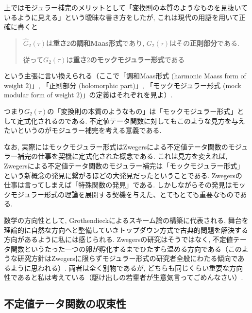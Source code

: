 \documentclass[11pt,b5paper,oneside,lualatex]{ltjsarticle} %
\numberwithin{equation}{section} %
\begin{document}
\begin{rem}
	上ではモジュラー補完のメリットとして「変換則の本質のようなものを見抜いているように見える」という曖昧な書き方をしたが, これは現代の用語を用いて正確に書くと
	\begin{quote}
		\centering
		$ \widehat{G}_2 (\tau) $は\textbf{重さ$ 2 $の調和Maas形式}であり, 
		$ G_2 (\tau) $はその\textbf{正則部分}である. 
		
		従って$ G_2 (\tau) $は\textbf{重さ$ 2 $のモックモジュラー形式}である
	\end{quote}
	という主張に言い換えられる（ここで「調和Maas形式 (harmonic Maass form of weight $ 2 $)」, 「正則部分 (holomorphic part)」, 「モックモジュラー形式 (mock modular form of weight $ 2 $)」の定義はそれぞれ\cite[Definition 4.2, Definition 4.4, Definition 5.16 i)]{BFOR}を見よ）. 
	
	つまり$ G_2 (\tau) $の「変換則の本質のようなもの」は「モックモジュラー形式」として定式化されるのである. 
	不定値テータ関数に対してもこのような見方を与えたいというのがモジュラー補完を考える意義である. 
	
	なお, 実際にはモックモジュラー形式はZwegersによる不定値テータ関数のモジュラー補完の仕事を契機に定式化された概念である. 
	これは見方を変えれば, Zwegersによる不定値テータ関数のモジュラー補完は「モックモジュラー形式」という新概念の発見に繋がるほどの大発見だったということである. 
	Zwegersの仕事は言ってしまえば「特殊関数の発見」である. 
	しかしながらその発見はモックモジュラー形式の理論を展開する契機を与えた、とてもとても重要なものである. 
	
	数学の方向性として, Grothendieckによるスキーム論の構築に代表される, 舞台を理論的に自然な方向へと整備していきトップダウン方式で古典的問題を解決する方向があるように私には感じられる. 
	Zwegersの研究はそうではなく, 不定値テータ関数というたった一つの卵が孵化するまでひたすら温める方向である（このような研究方針はZwegersに限らずモジュラー形式の研究者全般にわたる傾向であるように思われる）. 
	両者は全く別物であるが, どちらも同じくらい重要な方向性であると私は考えている（駆け出しの若輩者が生意気言ってごめんなさい）. 
\end{rem}



\subsection{不定値テータ関数の収束性} \label{subsec:indefinite_theta_convergency}
\end{document}
